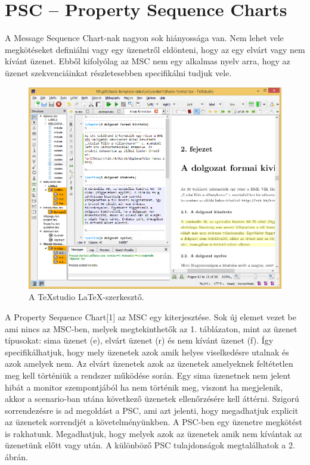 \chapter{PSC – Property Sequence Charts}
A Message Sequence Chart-nak nagyon sok hiányossága van. Nem lehet vele megkötéseket definiálni vagy egy üzenetről eldönteni, hogy az egy elvárt vagy nem kívánt üzenet. Ebből kifolyólag az MSC nem egy alkalmas nyelv arra, hogy az üzenet szekvenciáinkat részletesebben specifikálni tudjuk vele.

\begin{figure}[!ht]
\centering
\includegraphics[width=150mm, keepaspectratio]{figures/TeXstudio.png}
\caption{A TeXstudio \LaTeX-szerkesztő.}
\label{fig:TeXstudio}
\end{figure}

A Property Sequence Chart[1] az MSC egy kiterjesztése. Sok új elemet vezet be ami nincs az MSC-ben, melyek megtekinthetők az 1. táblázaton, mint az üzenet típusokat: sima üzenet (e), elvárt üzenet (r) és nem kívánt üzenet (f). Így specifikálhatjuk, hogy mely üzenetek azok amik helyes viselkedésre utalnak és azok amelyek nem. Az elvárt üzenetek azok az üzenetek amelyeknek feltétetlen meg kell történiük a rendszer működése során. Egy sima üzenetnek nem jelent hibát a monitor szempontjából ha nem történik meg, viszont ha megjelenik, akkor a scenario-ban utána következő üzenetek ellenőrzésére kell áttérni. Szigorú sorrendezésre is ad megoldást a PSC, ami azt jelenti, hogy megadhatjuk explicit az üzenetek sorrendjét a követelményünkben. A PSC-ben egy üzenetre megkötést is rakhatunk. Megadhatjuk, hogy melyek azok az üzenetek amik nem kívántak az üzenetünk előtt vagy után. A különböző PSC tulajdonságok megtalálhatok a 2. ábrán.

